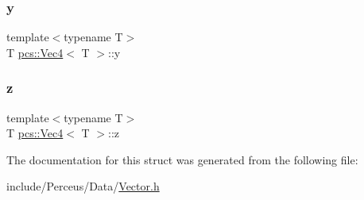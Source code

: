 \subsubsection{\texorpdfstring{y}{y}}
{\footnotesize\ttfamily template$<$typename T$>$ \\
T \hyperlink{structpcs_1_1Vec4}{pcs\+::\+Vec4}$<$ T $>$\+::y}

\mbox{\label{structpcs_1_1Vec4_acc074b9bebdebd5e8f1ee2680d155a3c}} 
\subsubsection{\texorpdfstring{z}{z}}
{\footnotesize\ttfamily template$<$typename T$>$ \\
T \hyperlink{structpcs_1_1Vec4}{pcs\+::\+Vec4}$<$ T $>$\+::z}



The documentation for this struct was generated from the following file\+:\begin{DoxyCompactItemize}
\item 
include/\+Perceus/\+Data/\hyperlink{Vector_8h}{Vector.\+h}\end{DoxyCompactItemize}
